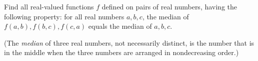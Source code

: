 Find all real-valued functions $f$ defined on pairs of real numbers, having the following property: for all real numbers $a, b, c$, the median of $f(a,b), f(b,c), f(c,a)$ equals the median of $a, b, c$.

(The \emph{median} of three real numbers, not necessarily distinct, is the number that is in the middle when the three numbers are arranged in nondecreasing order.)